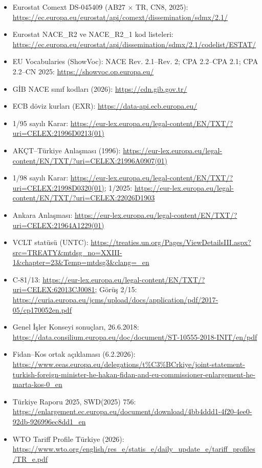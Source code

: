 \begin{itemize}
\tightlist
\item
  Eurostat Comext DS-045409 (AB27 × TR, CN8, 2025): \url{https://ec.europa.eu/eurostat/api/comext/dissemination/sdmx/2.1/}
\item
  Eurostat NACE\_R2 ve NACE\_R2\_1 kod listeleri: \url{https://ec.europa.eu/eurostat/api/dissemination/sdmx/2.1/codelist/ESTAT/}
\item
  EU Vocabularies (ShowVoc): NACE Rev. 2.1--Rev. 2; CPA 2.2--CPA 2.1; CPA 2.2--CN 2025: \url{https://showvoc.op.europa.eu/}
\item
  GİB NACE sınıf kodları (2026): \url{https://cdn.gib.gov.tr/}
\item
  ECB döviz kurları (EXR): \url{https://data-api.ecb.europa.eu/}
\item
  1/95 sayılı Karar: \url{https://eur-lex.europa.eu/legal-content/EN/TXT/?uri=CELEX:21996D0213(01)}
\item
  AKÇT--Türkiye Anlaşması (1996): \url{https://eur-lex.europa.eu/legal-content/EN/TXT/?uri=CELEX:21996A0907(01)}
\item
  1/98 sayılı Karar: \url{https://eur-lex.europa.eu/legal-content/EN/TXT/?uri=CELEX:21998D0320(01);} 1/2025: \url{https://eur-lex.europa.eu/legal-content/EN/TXT/?uri=CELEX:22026D1903}
\item
  Ankara Anlaşması: \url{https://eur-lex.europa.eu/legal-content/EN/TXT/?uri=CELEX:21964A1229(01)}
\item
  VCLT statüsü (UNTC): \url{https://treaties.un.org/Pages/ViewDetailsIII.aspx?src=TREATY\&mtdsg_no=XXIII-1\&chapter=23\&Temp=mtdsg3\&clang=_en}
\item
  C-81/13: \url{https://eur-lex.europa.eu/legal-content/EN/TXT/?uri=CELEX:62013CJ0081;} Görüş 2/15: \url{https://curia.europa.eu/jcms/upload/docs/application/pdf/2017-05/cp170052en.pdf}
\item
  Genel İşler Konseyi sonuçları, 26.6.2018: \url{https://data.consilium.europa.eu/doc/document/ST-10555-2018-INIT/en/pdf}
\item
  Fidan--Kos ortak açıklaması (6.2.2026): \url{https://www.eeas.europa.eu/delegations/t\%C3\%BCrkiye/joint-statement-turkish-foreign-minister-he-hakan-fidan-and-eu-commissioner-enlargement-he-marta-kos-0_en}
\item
  Türkiye Raporu 2025, SWD(2025) 756: \url{https://enlargement.ec.europa.eu/document/download/4bb4ddd1-4f20-4ee0-92db-926996ec8dd1_en}
\item
  WTO Tariff Profile Türkiye (2026): \url{https://www.wto.org/english/res_e/statis_e/daily_update_e/tariff_profiles/TR_e.pdf}

\end{itemize}

